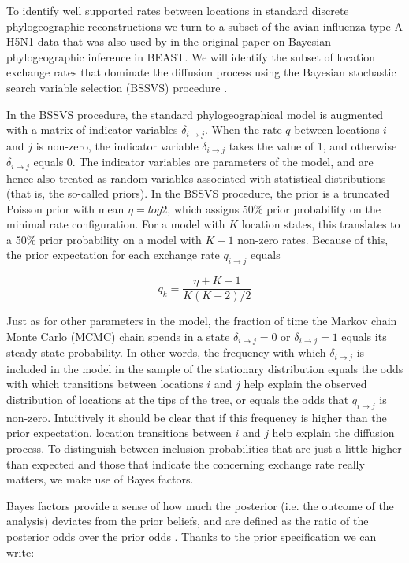 \documentclass[english]{paper}
\begin{document}
To identify well supported rates between locations in standard discrete phylogeographic reconstructions we turn to a subset of the avian influenza type A H5N1 data that was also used by \citet{lemey:2009fk} in the original paper on  Bayesian phylogeographic inference in BEAST.
We will identify the subset of location exchange rates that dominate the diffusion process using the Bayesian stochastic search variable selection (BSSVS) procedure \citep{lemey:2009fk}. %
\par
In the BSSVS procedure, the standard phylogeographical model is augmented with a matrix of indicator variables $\delta_{i{\rightarrow}j}$. %
When the rate  $q$ between locations $i$ and $j$ is non-zero, the indicator variable $\delta_{i{\rightarrow}j}$ takes the value of 1, and otherwise $\delta_{i{\rightarrow}j}$ equals 0.
The indicator variables are parameters of the model, and are hence also treated as random variables associated with statistical distributions (that is, the so-called priors).
In the BSSVS procedure, the prior is a truncated Poisson prior with mean $\eta = log2$, which assigns 50\% prior probability on the minimal rate configuration. 
For a model with $K$ location states, this translates to a 50\% prior probability on a model with $K-1$ non-zero rates.
Because of this, the prior expectation for each exchange rate $q_{i{\rightarrow}j}$ equals  

$$ q_k = \frac{\eta + K - 1}{K(K-2)/2}$$

Just as for other parameters in the model, the fraction of time the Markov chain Monte Carlo (MCMC) chain spends in a state $\delta_{i{\rightarrow}j} = 0$ or $\delta_{i{\rightarrow}j} = 1$ equals its steady state probability.
In other words, the frequency with which $\delta_{i{\rightarrow}j}$ is included in the model in the sample of the stationary distribution equals the odds with which transitions between locations $i$ and $j$ help explain the observed distribution of locations at the tips of the tree, or equals the odds that $q_{i{\rightarrow}j}$ is non-zero.
Intuitively it should be clear that if this frequency is higher than the prior expectation, location transitions between $i$ and $j$ help explain the diffusion process. 
To distinguish between inclusion probabilities that are just a little higher than expected and those that indicate the  concerning exchange rate really matters, we make use of Bayes factors.
\par
Bayes factors provide a sense of how much the posterior (i.e. the outcome of the analysis) deviates from the prior beliefs, and are defined as the ratio of the posterior odds over the prior odds \citep{kass:1995a}.
Thanks to the prior specification we can write:
\end{document}
